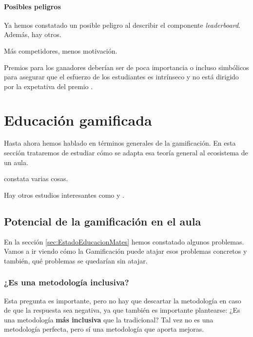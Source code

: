 \paragraph{Posibles peligros}

Ya hemos constatado un posible peligro al describir el componente \textit{leaderboard}. Además, hay otros.

Más competidores, menos motivación. \cite{n-effect}

Premios para los ganadores deberían ser de poca importancia o incluso simbólicos para asegurar que el esfuerzo de los estudiantes es intrínseco y no está dirigido por la expetativa del premio \cite{CompetitionInEd}.

\section{Educación gamificada}

Hasta ahora hemos hablado en términos generales de la gamificación. 
%
En esta sección trataremos de estudiar cómo se adapta esa teoría general al ecosistema de un aula.

\cite{lee2011gamification} constata varias cosas.

Hay otros estudios interesantes como \cite{Hanus2015152} y \cite{ReviewGamificationInEducation}.

\subsection{Potencial de la gamificación en el aula}

En la sección \ref{sec:EstadoEducacionMates} hemos constatado algunos problemas. 
%
Vamos a ir viendo cómo la Gamificación puede atajar esos problemas concretos y también, qué problemas se quedarían sin atajar.

\subsubsection{¿Es una metodología inclusiva?}

Esta pregunta es importante, pero no hay que descartar la metodología en caso de que la respuesta sea negativa, ya que también es importante plantearse:  ¿Es una metodología \textbf{más inclusiva} que la tradicional?
%
Tal vez no es una metodología perfecta, pero sí una metodología que aporta mejoras.

